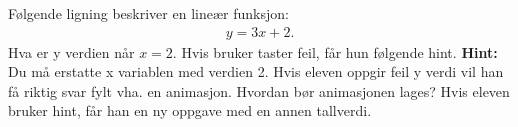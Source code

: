 \documentclass[12pt,twoside,onecolumn]{article}
\begin{document}
\begin{Exercise}
Følgende ligning beskriver en lineær funksjon:
\begin{align}
y = 3x + 2.
\end{align}
Hva er y verdien når $x = 2$. \newline
{\color{Maroon} Hvis bruker taster feil, får hun følgende hint.} \newline
\textbf{Hint:} Du må erstatte x variablen med verdien 2. \newline\newline
{\color{Maroon} Hvis eleven oppgir feil y verdi vil han få riktig svar fylt vha. en animasjon.}\newline
{\color{Cerulean} Hvordan bør animasjonen lages?} \newline
{\color{Maroon} Hvis eleven bruker hint, får han en ny oppgave med en annen tallverdi.}
\end{Exercise}
\end{document}
